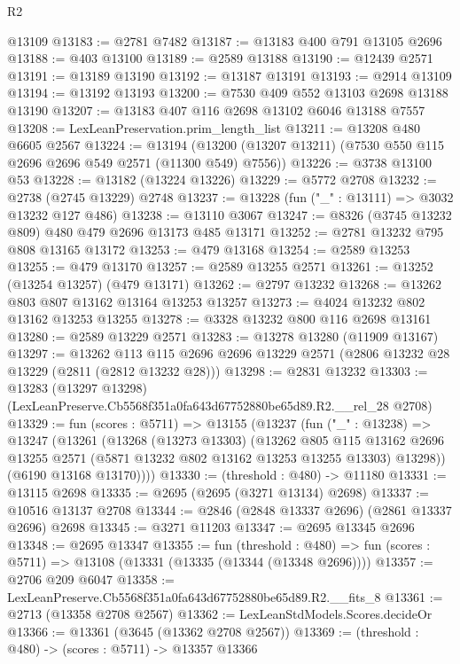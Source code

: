 \begin{lexlean}{R2}
\begin{coremodule}
    @13109
@13183 := @2781 @7482
@13187 := @13183 @400 @791 @13105 @2696
@13188 := @403 @13100
@13189 := @2589 @13188
@13190 := @12439 @2571
@13191 := @13189 @13190
@13192 := @13187 @13191
@13193 := @2914 @13109
@13194 := @13192 @13193
@13200 := @7530 @409 @552 @13103 @2698 @13188 @13190
@13207 := @13183 @407 @116 @2698 @13102 @6046 @13188 @7557
@13208 := LexLeanPreservation.prim_length_list
@13211 := @13208 @480 @6605 @2567
@13224 := @13194
    (@13200 (@13207 @13211) (@7530 @550 @115 @2696 @2696 @549 @2571 (@11300 @549) @7556))
@13226 := @3738 @13100 @53
@13228 := @13182 (@13224 @13226)
@13229 := @5772 @2708
@13232 := @2738 (@2745 @13229) @2748
@13237 := @13228 (fun ("_" : @13111) => @3032 @13232 @127 @486)
@13238 := @13110 @3067
@13247 := @8326 (@3745 @13232 @809) @480 @479 @2696 @13173 @485 @13171
@13252 := @2781 @13232 @795 @808 @13165 @13172
@13253 := @479 @13168
@13254 := @2589 @13253
@13255 := @479 @13170
@13257 := @2589 @13255 @2571
@13261 := @13252 (@13254 @13257) (@479 @13171)
@13262 := @2797 @13232
@13268 := @13262 @803 @807 @13162 @13164 @13253 @13257
@13273 := @4024 @13232 @802 @13162 @13253 @13255
@13278 := @3328 @13232 @800 @116 @2698 @13161
@13280 := @2589 @13229 @2571
@13283 := @13278 @13280 (@11909 @13167)
@13297 := @13262
    @113
    @115
    @2696
    @2696
    @13229
    @2571
    (@2806 @13232 @28 @13229 (@2811 (@2812 @13232 @28)))
@13298 := @2831 @13232
@13303 := @13283
    (@13297 @13298)
    (LexLeanPreserve.Cb5568f351a0fa643d67752880be65d89.R2.__rel_28 @2708)
@13329 := fun (scores : @5711) =>
  @13155
    (@13237
      (fun ("_" : @13238) =>
      @13247
        (@13261
          (@13268
            (@13273 @13303)
            (@13262
              @805
              @115
              @13162
              @2696
              @13255
              @2571
              (@5871 @13232 @802 @13162 @13253 @13255 @13303)
              @13298))
          (@6190 @13168 @13170))))
@13330 := (threshold : @480) -> @11180
@13331 := @13115 @2698
@13335 := @2695 (@2695 (@3271 @13134) @2698)
@13337 := @10516 @13137 @2708
@13344 := @2846 (@2848 @13337 @2696) (@2861 @13337 @2696) @2698
@13345 := @3271 @11203
@13347 := @2695 @13345 @2696
@13348 := @2695 @13347
@13355 := fun (threshold : @480) =>
  fun (scores : @5711) => @13108 (@13331 (@13335 (@13344 (@13348 @2696))))
@13357 := @2706 @209 @6047
@13358 := LexLeanPreserve.Cb5568f351a0fa643d67752880be65d89.R2.__fits_8
@13361 := @2713 (@13358 @2708 @2567)
@13362 := LexLeanStdModels.Scores.decideOr
@13366 := @13361 (@3645 (@13362 @2708 @2567))
@13369 := (threshold : @480) -> (scores : @5711) -> @13357 @13366

\end{coremodule}
\end{lexlean}
